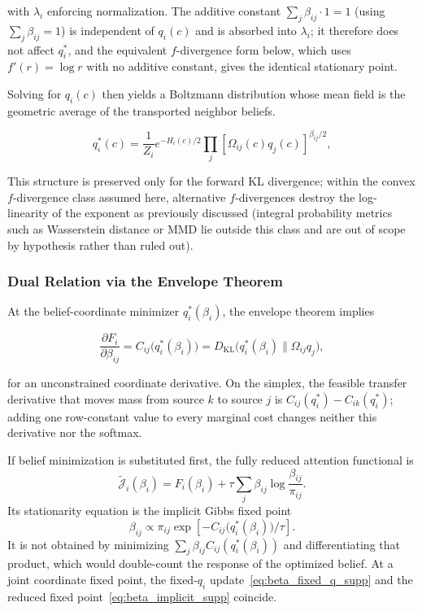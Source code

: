 \documentclass[twoside,11pt]{article}
\begin{document}
with $\lambda_i$ enforcing normalization. The additive constant $\sum_j \beta_{ij} \cdot 1 = 1$ (using $\sum_j \beta_{ij} = 1$) is independent of $q_i(c)$ and is absorbed into $\lambda_i$; it therefore does not affect $q_i^*$, and the equivalent $f$-divergence form below, which uses $f'(r) = \log r$ with no additive constant, gives the identical stationary point.

Solving for $q_i(c)$ then yields a Boltzmann distribution whose mean field is the geometric average of the transported neighbor beliefs.

\begin{equation}
q_i^*(c)
= \frac{1}{Z_i}
e^{-H_i(c)/2}
\prod_j
[\Omega_{ij}(c) q_j(c)]^{\beta_{ij}/2},
\label{eq:q_i_star_supp}
\end{equation}

This structure is preserved only for the forward KL divergence; within the convex $f$-divergence class assumed here, alternative $f$-divergences destroy the log-linearity of the exponent as previously discussed (integral probability metrics such as Wasserstein distance or MMD lie outside this class and are out of scope by hypothesis rather than ruled out).

\subsubsection{Dual Relation via the Envelope Theorem}
At the belief-coordinate minimizer $q_i^*(\beta_i)$, the envelope theorem implies

\begin{equation}
\frac{\partial F_i}{\partial \beta_{ij}}
= C_{ij}\bigl(q_i^*(\beta_i)\bigr)
= D_{\mathrm{KL}}\bigl(q_i^*(\beta_i) \| \Omega_{ij}q_j\bigr),
\label{eq:envelope_supp}
\end{equation}

for an unconstrained coordinate derivative. On the simplex, the feasible transfer derivative that moves mass from source $k$ to source $j$ is $C_{ij}(q_i^*)-C_{ik}(q_i^*)$; adding one row-constant value to every marginal cost changes neither this derivative nor the softmax.

If belief minimization is substituted first, the fully reduced attention functional is
\begin{equation}
\widetilde{\mathcal J}_i(\beta_i)
=F_i(\beta_i)+\tau\sum_j\beta_{ij}\log\frac{\beta_{ij}}{\pi_{ij}}.
\label{eq:J_reduced_beta_supp}
\end{equation}
Its stationarity equation is the implicit Gibbs fixed point
\begin{equation}
\beta_{ij}
\propto \pi_{ij}\exp\left[-C_{ij}\bigl(q_i^*(\beta_i)\bigr)/\tau\right].
\label{eq:beta_implicit_supp}
\end{equation}
It is not obtained by minimizing $\sum_j\beta_{ij}C_{ij}(q_i^*(\beta_i))$ and differentiating that product, which would double-count the response of the optimized belief. At a joint coordinate fixed point, the fixed-$q_i$ update~\eqref{eq:beta_fixed_q_supp} and the reduced fixed point~\eqref{eq:beta_implicit_supp} coincide.
\end{document}
